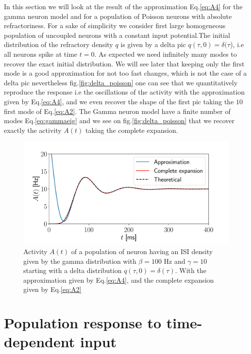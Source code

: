 \documentclass[12pt,twoside]{report}
\begin{document}
In this section we will look at the result of the approximation Eq.\eqref{eq:A4} for the gamma  neuron model and for a population of Poisson neurons with absolute refractoriness. For a sake of simplicity we consider first large homogeneous population of uncoupled neurons with a constant input potential.The initial distribution of the refractory density $q$ is given by a delta pic $q(\tau,0)=\delta(\tau$), i.e all neurons spike at time $t=0$.
As expected we need infinitely many modes to recover the exact initial distribution. We will see later that keeping only the first mode is a good approximation for not too fast changes, which is not the case of a delta pic nevertheless  fig.\ref{fig:delta_poisson} one can see that we quantitatively reproduce the response i.e the oscillations of the activity with the approximation given by Eq.\eqref{eq:A4}, and we even recover the shape of the first pic taking the $10$ first mode of Eq.\eqref{eq:A2}.
The Gamma neuron model have a finite number of modes Eq.\ref{eq:gammaeig} and we see on fig.\ref{fig:delta_poisson} that we recover exactly the activity $A(t)$ taking the complete expansion.


\begin{figure}[h!]
	\centering
	\includegraphics[width=0.8\linewidth]{delta_gamma.pdf}
	\caption{Activity $A(t)$ of a population of neuron having an ISI density given by the gamma distribution with $\beta=100$ Hz and $\gamma=10$ starting with a delta distribution $q(\tau,0)=\delta(\tau)$. With the approximation given by Eq.\eqref{eq:A4}, and the complete expansion given by Eq.\ref{eq:A2}}
	\label{fig:delta_gamma}
\end{figure}


\section{Population response to time-dependent input}
\label{sec:uncoupletimedep}
\end{document}
